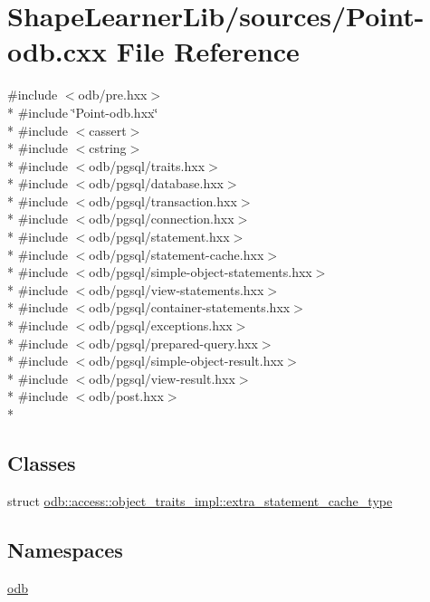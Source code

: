 \hypertarget{_point-odb_8cxx}{}\section{Shape\+Learner\+Lib/sources/\+Point-\/odb.cxx File Reference}
\label{_point-odb_8cxx}
{\ttfamily \#include $<$odb/pre.\+hxx$>$}\\*
{\ttfamily \#include \char`\"{}Point-\/odb.\+hxx\char`\"{}}\\*
{\ttfamily \#include $<$cassert$>$}\\*
{\ttfamily \#include $<$cstring$>$}\\*
{\ttfamily \#include $<$odb/pgsql/traits.\+hxx$>$}\\*
{\ttfamily \#include $<$odb/pgsql/database.\+hxx$>$}\\*
{\ttfamily \#include $<$odb/pgsql/transaction.\+hxx$>$}\\*
{\ttfamily \#include $<$odb/pgsql/connection.\+hxx$>$}\\*
{\ttfamily \#include $<$odb/pgsql/statement.\+hxx$>$}\\*
{\ttfamily \#include $<$odb/pgsql/statement-\/cache.\+hxx$>$}\\*
{\ttfamily \#include $<$odb/pgsql/simple-\/object-\/statements.\+hxx$>$}\\*
{\ttfamily \#include $<$odb/pgsql/view-\/statements.\+hxx$>$}\\*
{\ttfamily \#include $<$odb/pgsql/container-\/statements.\+hxx$>$}\\*
{\ttfamily \#include $<$odb/pgsql/exceptions.\+hxx$>$}\\*
{\ttfamily \#include $<$odb/pgsql/prepared-\/query.\+hxx$>$}\\*
{\ttfamily \#include $<$odb/pgsql/simple-\/object-\/result.\+hxx$>$}\\*
{\ttfamily \#include $<$odb/pgsql/view-\/result.\+hxx$>$}\\*
{\ttfamily \#include $<$odb/post.\+hxx$>$}\\*
\subsection*{Classes}
\begin{DoxyCompactItemize}
\item 
struct \hyperlink{structodb_1_1access_1_1object__traits__impl_1_1extra__statement__cache__type}{odb\+::access\+::object\+\_\+traits\+\_\+impl\+::extra\+\_\+statement\+\_\+cache\+\_\+type}
\end{DoxyCompactItemize}
\subsection*{Namespaces}
\begin{DoxyCompactItemize}
\item 
 \hyperlink{namespaceodb}{odb}
\end{DoxyCompactItemize}
